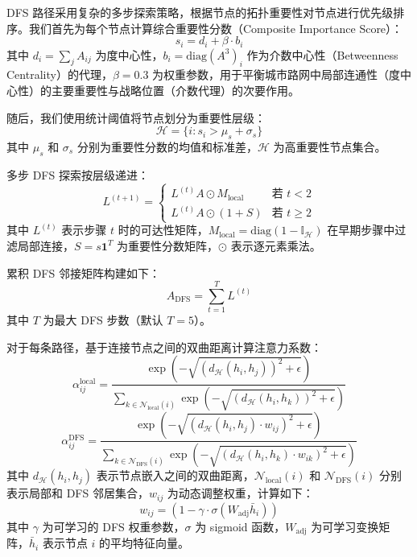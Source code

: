DFS 路径采用复杂的多步探索策略，根据节点的拓扑重要性对节点进行优先级排序。我们首先为每个节点计算综合重要性分数（Composite Importance Score）：
\begin{equation}
s_i = d_i + \beta \cdot b_i
\label{eq:importance_score}
\end{equation}
其中 $d_i = \sum_j A_{ij}$ 为度中心性，$b_i = \text{diag}(A^3)_i$ 作为介数中心性（Betweenness Centrality）的代理，$\beta = 0.3$ 为权重参数，用于平衡城市路网中局部连通性（度中心性）的主要重要性与战略位置（介数代理）的次要作用。

随后，我们使用统计阈值将节点划分为重要性层级：
\begin{equation}
\mathcal{H} = \{i : s_i > \mu_s + \sigma_s\}
\label{eq:high_importance}
\end{equation}
其中 $\mu_s$ 和 $\sigma_s$ 分别为重要性分数的均值和标准差，$\mathcal{H}$ 为高重要性节点集合。

多步 DFS 探索按层级递进：
\begin{equation}
L^{(t+1)} = \begin{cases}
L^{(t)}A \odot M_{\text{local}} & \text{若 } t < 2 \\
L^{(t)}A \odot (1 + S) & \text{若 } t \geq 2
\end{cases}
\label{eq:dfs_exploration}
\end{equation}
其中 $L^{(t)}$ 表示步骤 $t$ 时的可达性矩阵，$M_{\text{local}} = \text{diag}(1-\mathbb{I}_{\mathcal{H}})$ 在早期步骤中过滤局部连接，$S = s\mathbf{1}^T$ 为重要性分数矩阵，$\odot$ 表示逐元素乘法。

累积 DFS 邻接矩阵构建如下：
\begin{equation}
A_{\text{DFS}} = \sum_{t=1}^T L^{(t)}
\label{eq:dfs_adjacency}
\end{equation}
其中 $T$ 为最大 DFS 步数（默认 $T = 5$）。

对于每条路径，基于连接节点之间的双曲距离计算注意力系数：
\begin{equation}
\alpha_{ij}^{\text{local}} = \frac{\exp(-\sqrt{(d_{\mathcal{H}}(h_i,h_j))^2 + \epsilon})}{\sum_{k \in \mathcal{N}_{\text{local}}(i)}\exp(-\sqrt{(d_{\mathcal{H}}(h_i,h_k))^2 + \epsilon})}
\label{eq:local_attention}
\end{equation}
\begin{equation}
\alpha_{ij}^{\text{DFS}} = \frac{\exp(-\sqrt{(d_{\mathcal{H}}(h_i,h_j) \cdot w_{ij})^2 + \epsilon})}{\sum_{k \in \mathcal{N}_{\text{DFS}}(i)}\exp(-\sqrt{(d_{\mathcal{H}}(h_i,h_k) \cdot w_{ik})^2 + \epsilon})}
\label{eq:dfs_attention}
\end{equation}
其中 $d_{\mathcal{H}}(h_i,h_j)$ 表示节点嵌入之间的双曲距离，$\mathcal{N}_{\text{local}}(i)$ 和 $\mathcal{N}_{\text{DFS}}(i)$ 分别表示局部和 DFS 邻居集合，$w_{ij}$ 为动态调整权重，计算如下：
\begin{equation}
w_{ij} = (1 - \gamma \cdot \sigma(W_{\text{adj}}\bar{h}_i))
\label{eq:dynamic_weight}
\end{equation}
其中 $\gamma$ 为可学习的 DFS 权重参数，$\sigma$ 为 sigmoid 函数，$W_{\text{adj}}$ 为可学习变换矩阵，$\bar{h}_i$ 表示节点 $i$ 的平均特征向量。

